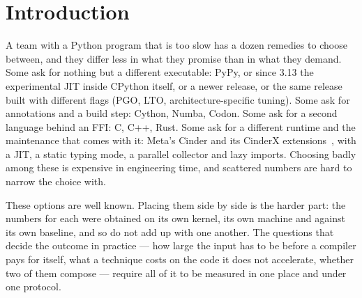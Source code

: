 \documentclass[10pt,a4paper]{article}
\newcommand{\meas}[2]{#2}
\newcommand{\code}[1]{\texttt{\small #1}}
\begin{document}
\begin{abstract}
replace. The largest factor available without editing the source is PyPy, which runs our
unmodified
pure-Python kernels $3.2$--$\meas{ratio:b1_compute-314:matmul/cpython_loop|b1_compute-pypy311:matmul/cpython_loop}{42.8}\times$ faster but whose one \code{ctypes} call that hands a
two-megabyte buffer across the boundary costs $\meas{ratio:b2_branchy-pypy311:tokenize/c_ctypes|b2_branchy-314:tokenize/c_ctypes}{5.3}\times$ more than CPython's while the calls
that pass only integers are within $\meas{pct:b2_branchy-314:binarytrees/rust_ctypes|b2_branchy-pypy311:binarytrees/rust_ctypes}{7}\%$: ``switch runtime'' and ``move the hot loop to C''
exclude each other only where the boundary carries bulk data.
All code, all \code{pyperf} result files and the figure and table generators are in the
accompanying artifact; every figure and table here is regenerated from those files by the
generator commands of \S\ref{sec:repro}.
\end{abstract}

\section{Introduction}
\label{sec:intro}

A team with a Python program that is too slow has a dozen remedies to choose between, and they
differ less in what they promise than in what they demand. Some ask for nothing but a different
executable: PyPy, or since 3.13 the experimental JIT inside CPython itself, or a newer release,
or the same release built with different flags (PGO, LTO, architecture-specific tuning). Some
ask for annotations and a build step: Cython, Numba, Codon. Some ask for a second language
behind an FFI: C, C++, Rust. Some ask for a different runtime and the maintenance that comes
with it: Meta's Cinder and its CinderX extensions~\cite{cinder}, with a JIT, a static typing
mode, a parallel collector and lazy imports. Choosing badly among these is expensive in
engineering time, and scattered numbers are hard to narrow the choice with.

These options are well known. Placing them side by side is the harder part: the numbers for each
were obtained on its own kernel, its own machine and against its own baseline, and so do not add
up with one another. The questions that decide the outcome in practice --- how large the input
has to be before a compiler pays for itself, what a technique costs on the code it does not
accelerate, whether two of them compose --- require all of it to be measured in one place and
under one protocol.
\end{document}
